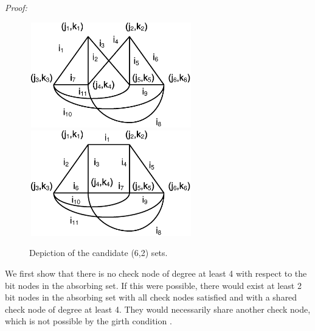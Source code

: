\noindent \textit{Proof:}
\begin{figure}
\center\includegraphics[width=2.8in,height=1.8in]{Drawing30_2.eps}
\center\includegraphics[width=2.8in,height=1.8in]{Drawing32_1.eps}\hspace{0.3in}
\caption{Depiction of the candidate (6,2) sets.} \label{fig62}
\end{figure}
We first show that there is no check node of degree at least 4
with respect to the bit nodes in the absorbing set. If this were
possible, there would exist at least 2 bit nodes  in the absorbing
set with all check nodes satisfied and with a shared check node of
degree at least 4. They would necessarily share another check
node, which is not possible by the girth condition \cite{fan}.

